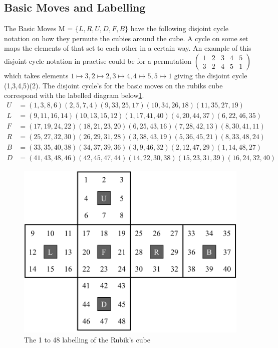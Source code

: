 \documentclass{article}
\newcounter{lem}[section]\setcounter{lem}{0}
\begin{document}
\subsection{Basic Moves and Labelling}
The Basic Moves M = $\{L,R,U,D,F,B\}$ have the following disjoint cycle notation on how they permute the cubies around the cube. A cycle on some set maps the elements of that set to each other in a certain way. An example of this disjoint cycle notation in practise could be for a permutation $\begin{pmatrix} 1 &2 &3 &4 &5\\ 3 & 2& 4&5&1\end{pmatrix}$ which takes elements $1 \mapsto 3, 2 \mapsto 2, 3\mapsto 4, 4 \mapsto 5  ,5\mapsto 1$ giving the disjoint cycle  (1,3,4,5)(2). The disjoint cycle's for the basic moves on the rubiks cube correspond with the labelled diagram below\ref{fig:labelled}.
\begin{align*}
U&=( 1, 3, 8, 6)( 2, 5, 7, 4)( 9,33,25,17)(10,34,26,18)(11,35,27,19)\\
L&=( 9,11,16,14)(10,13,15,12)( 1,17,41,40)( 4,20,44,37)( 6,22,46,35)\\
F&=(17,19,24,22)(18,21,23,20)( 6,25,43,16)( 7,28,42,13)( 8,30,41,11)\\
R&=(25,27,32,30)(26,29,31,28)( 3,38,43,19)( 5,36,45,21)( 8,33,48,24)\\
B&=(33,35,40,38)(34,37,39,36)( 3, 9,46,32)( 2,12,47,29)( 1,14,48,27)\\
D&= (41,43,48,46)(42,45,47,44)(14,22,30,38)(15,23,31,39)(16,24,32,40)
\end{align*}

\begin{figure}[hbt]
\includegraphics[scale=.24]{numbercube.png}
\caption{The 1 to 48 labelling of the Rubik's cube}
\label{fig:labelled}
\end{figure}
\end{document}
